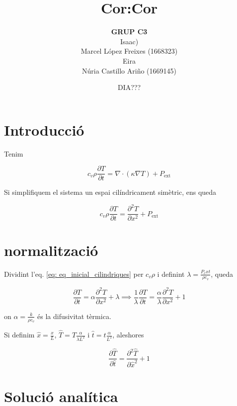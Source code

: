 \documentclass[11pt]{article}
\title{\Huge\bfseries Cor:Cor \\[1ex] \Large}
\author{\begin{tabular}{c}
\textbf{GRUP C3} \\
Isaac) \\
Marcel López Freixes (1668323) \\
Eira \\
Núria Castillo Ariño (1669145)
\end{tabular}}
\date{DIA???}
\begin{document}
\maketitle

\section{Introducció}


Tenim 

\begin{equation}
    c_v \rho \frac{\partial T}{\partial t} = \nabla \cdot (\kappa \nabla T) + P_{\text{ext}}
\label{eq: eq_inicial}
\end{equation}


Si simplifiquem el sistema un espai cilíndricament simètric, ens queda


\begin{equation}
    c_v \rho \frac{\partial T}{\partial t} = \frac{\partial^2 T}{\partial x^2} + P_{\text{ext}}
\label{eq: eq_inicial_cilindriques}
\end{equation}
\section{normalització}

Dividint l'eq. \eqref{eq: eq_inicial_cilindriques} per $c_v\rho$ i definint $\lambda=\frac{P_ext}{\rho c_v}$, queda

\begin{equation}
    \frac{\partial T}{\partial t} = \alpha \frac{\partial^2 T}{\partial x^2} + \lambda \implies \frac{1}{\lambda}\frac{\partial T}{\partial t} = \frac{\alpha}{\lambda} \frac{\partial^2 T}{\partial x^2} + 1
\label{eq: eq_entre_rhocv}
\end{equation}

on $\alpha=\frac{k}{\rho c_v}$ és la difusivitat tèrmica.

Si definim $\hat{x}=\frac{x}{L}$, $\hat{T}=T \frac{\alpha}{\lambda L^2}$ i $\hat{t}=t\frac{\alpha}{L^2}$, aleshores

\begin{equation}
    \frac{\partial \hat{T}}{\partial \hat{t}} = \frac{\partial^2 \hat{T}}{\partial \hat{x}^2} + 1
\label{eq: eq_normalitzada}
\end{equation}

\section{Solució analítica}
\end{document}
